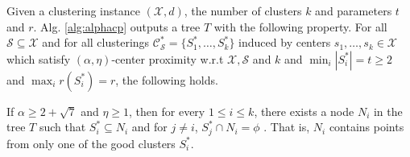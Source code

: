 \documentclass[anon,12pt]{colt2016} %
\newcommand{\mc}{\mathcal}
\begin{document}
\begin{theorem}
\label{thm:alphacpnoise}
Given a clustering instance $(\mc X, d)$, the number of clusters $k$ and parameters $t$ and $r$. Alg. \ref{alg:alphacp} outputs a tree $T$ with the following property. For all $\mc S \subseteq \mc X$ and for all clusterings $\mc C^*_{\mc S} = \{S_1^*, \ldots, S_k^*\}$ induced by centers $s_1, \ldots, s_k \in \mc X$ which satisfy $(\alpha, \eta)$-center proximity w.r.t $\mc X, \mc S$ and $k$ and $\min_i|S_i^*| = t \ge 2$ and $\max_i r(S_i^*) = r$, the following holds. 

If $\alpha \ge 2 + \sqrt 7$ and $\eta \ge 1$, then for every $1\le i \le k$, there exists a node $N_i$ in the tree $T$ such that $S_i^* \subseteq N_i$ and for $j \neq i$, $S_j^* \cap N_i = \phi$ . That is, $N_i$ contains points from only one of the good clusters $S_i^*$.
\end{theorem}
\end{document}
